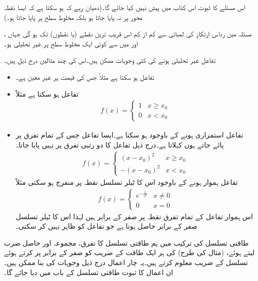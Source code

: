 اس مسئلے کا ثبوت اس کتاب میں پیش نہیں کیا جائے گا۔(دھیان رہے کہ ہو سکتا ہے کہ ایسا نقطہ محور  پر نہ پایا جاتا ہو بلکہ مخلوط سطح پر پایا جاتا ہو۔)

مسئلہ  میں  رداس ارتکاز  کی لمبائی  سے کم از کم اس قریب ترین نقطے (یا نقطوں) تک ہو گی جہاں  ،  اور   میں سے کوئی ایک مخلوط سطح پر غیر تحلیلی ہو۔

تفاعل غیر تحلیلی ہونے کی کئی وجوہات ممکن ہیں۔اس کی چند مثالیں درج ذیل ہیں۔
\begin{itemize}
\item
تفاعل  ہو سکتا ہے مثلاً  جس کی قیمت  پر غیر معین ہے۔
\item
تفاعل  ہو سکتا ہے مثلاً 
\begin{align*}
f(x)=
\begin{cases}
1&x\ge x_0\\
0& x<x_0
\end{cases}
\end{align*}
%
\item
تفاعل استمراری ہونے کے باوجود  ہو سکتا ہے۔ایسا تفاعل جس کے تمام تفرق  پر پائے جاتے ہوں  کہلاتا ہے۔درج ذیل تفاعل کا دو رتبی تفرق  پر نہیں پایا جاتا۔
\begin{align*}
f(x)=
\begin{cases}
(x-x_0)^2&x\ge x_0\\
-(x-x_0)^2& x<x_0
\end{cases}
\end{align*}
%
تفاعل ہموار ہونے کے باوجود اس کا ٹیلر تسلسل نقطہ  پر منفرج  ہو سکتی مثلاً
\begin{align*}
f(x)=
\begin{cases}
e^{-\frac{1}{x^2}}&x\ne 0\\
0& x=0
\end{cases}
\end{align*}
اس ہموار تفاعل کے تمام تفرق نقطہ  پر صفر کے برابر ہیں لہٰذا  اس کا ٹیلر تسلسل صفر کے برابر حاصل ہوتا ہے جو تفاعل کو ظاہر نہیں کر سکتی۔ 
%
\end{itemize}

طاقتی تسلسل کی ترکیب میں ہم طاقتی تسلسل کا تفرق، مجموعہ اور  حاصل ضرب لیتے ہوئے، (مثال  کی طرح)  کی ہر ایک طاقت کے  ضریب  کو صفر کے برابر پر کرتے ہوئے تسلسل  کے  ضریب  معلوم کرتے ہیں۔یہ چار اعمال درج ذیل وجوہات کی بنا ممکن ہیں۔ ان اعمال کا ثبوت طاقتی تسلسل کے باب میں دیا جائے گا۔

